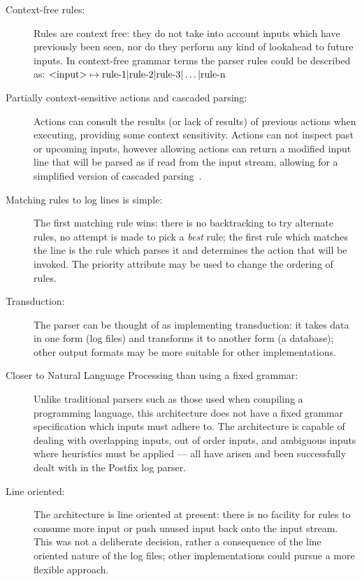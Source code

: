\documentclass[draft]{svmult}
\begin{document}
\begin{description}

    \item [Context-free rules:]  Rules are context free: they do not take
        into account inputs which have previously been seen, nor do they
        perform any kind of lookahead to future inputs.  In context-free
        grammar terms the parser rules could be described as:
        $\text{\textless{}input\textgreater{}} \mapsto \text{rule-1} |
        \text{rule-2} | \text{rule-3} | \dots | \text{rule-n}$

    \item [Partially context-sensitive actions and cascaded parsing:]
        Actions can consult the results (or lack of results) of previous
        actions when executing, providing some context sensitivity.
        Actions can not inspect past or upcoming inputs, however allowing
        actions can return a modified input line that will be parsed as if
        read from the input stream, allowing for a simplified version of
        cascaded parsing~\cite{cascaded-parsing}.

    \item [Matching rules to log lines is simple:]  The first matching rule
        wins: there is no backtracking to try alternate rules, no attempt
        is made to pick a \textit{best\/} rule; the first rule which
        matches the line is the rule which parses it and determines the
        action that will be invoked.  The priority attribute may be used to
        change the ordering of rules.

    \item [Transduction:]  The parser can be thought of as implementing
        transduction: it takes data in one form (log files) and transforms
        it to another form (a database); other output formats may be more
        suitable for other implementations.

    \item [Closer to Natural Language Processing than using a fixed
        grammar:] Unlike traditional parsers such as those used when
        compiling a programming language, this architecture does not have a
        fixed grammar specification which inputs must adhere to.  The
        architecture is capable of dealing with overlapping inputs, out of
        order inputs, and ambiguous inputs where heuristics must be applied
        --- all have arisen and been successfully dealt with in the Postfix
        log parser.

    \item [Line oriented:]  The architecture is line oriented at present:
        there is no facility for rules to consume more input or push unused
        input back onto the input stream.  This was not a deliberate
        decision, rather a consequence of the line oriented nature of the
        log files; other implementations could pursue a more flexible
        approach.

\end{description}
\end{document}
